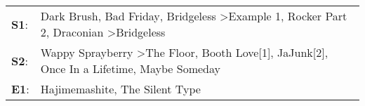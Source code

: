 \begin{supertabular}{p{0.03\textwidth}p{0.92\textwidth}}
 \textbf{S1}:  &  Dark Brush\textsuperscript{}, \enspace Bad Friday\textsuperscript{}, \enspace Bridgeless\textsuperscript{} \textgreater \enspace Example 1\textsuperscript{}, \enspace Rocker Part 2\textsuperscript{}, \enspace Draconian\textsuperscript{} \textgreater \enspace Bridgeless\textsuperscript{}  \enspace  \\
 \textbf{S2}:  &                                    Wappy Sprayberry\textsuperscript{} \textgreater \enspace The Floor\textsuperscript{}, \enspace Booth Love[1]\textsuperscript{}, \enspace JaJunk[2]\textsuperscript{}, \enspace Once In a Lifetime\textsuperscript{}, \enspace Maybe Someday\textsuperscript{}  \enspace  \\
 \textbf{E1}:  &                                                                                                                                                                                                                      Hajimemashite\textsuperscript{}, \enspace The Silent Type\textsuperscript{}  \enspace  \\
\end{supertabular}
